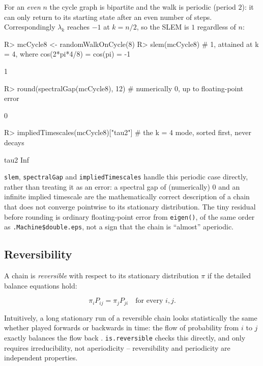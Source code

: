 \documentclass[
  nojss]{jss}
\begin{document}
For an \emph{even} \(n\) the cycle graph is bipartite and the walk is periodic
(period \(2\)): it can only return to its starting state after an even number
of steps. Correspondingly \(\lambda_k\) reaches \(-1\) at \(k=n/2\), so the SLEM
is \(1\) regardless of \(n\):

\begin{CodeChunk}
\begin{CodeInput}
R> mcCycle8 <- randomWalkOnCycle(8)
R> slem(mcCycle8) # 1, attained at k = 4, where cos(2*pi*4/8) = cos(pi) = -1
\end{CodeInput}
\begin{CodeOutput}
[1] 1
\end{CodeOutput}
\begin{CodeInput}
R> round(spectralGap(mcCycle8), 12) # numerically 0, up to floating-point error
\end{CodeInput}
\begin{CodeOutput}
[1] 0
\end{CodeOutput}
\begin{CodeInput}
R> impliedTimescales(mcCycle8)["tau2"] # the k = 4 mode, sorted first, never decays
\end{CodeInput}
\begin{CodeOutput}
tau2 
 Inf 
\end{CodeOutput}
\end{CodeChunk}

\texttt{slem}, \texttt{spectralGap} and \texttt{impliedTimescales} handle this periodic case
directly, rather than treating it as an error: a spectral gap of (numerically)
\(0\) and an infinite implied timescale are the mathematically correct
description of a chain that does not converge pointwise to its stationary
distribution. The tiny residual before rounding is ordinary floating-point
error from \texttt{eigen()}, of the same order as \texttt{.Machine\$double.eps}, not a sign
that the chain is ``almost'' aperiodic.

\subsection{Reversibility}\label{reversibility}

A chain is \emph{reversible} with respect to its stationary distribution \(\pi\)
if the detailed balance equations hold:

\[
\pi_i P_{ij} = \pi_j P_{ji} \quad \text{for every } i,j.
\]

Intuitively, a long stationary run of a reversible chain looks statistically
the same whether played forwards or backwards in time: the flow of
probability from \(i\) to \(j\) exactly balances the flow back
\citep{NorrisBook,levinPeres2017}. \texttt{is.reversible} checks this directly, and
only requires irreducibility, not aperiodicity -- reversibility and
periodicity are independent properties.
\end{document}
